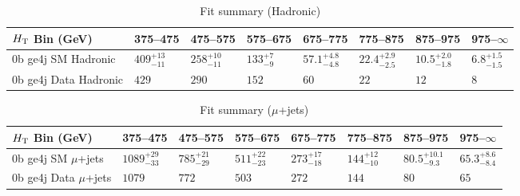 \documentclass[8pt]{article}
\def\scalht{\mbox{$H_{\rm{T}}$}\xspace}
\newcommand\T{\rule{0pt}{2.6ex}}
\begin{document}
\begin{table}[ht!]
\caption{Fit summary (Hadronic)}
\label{tab:ensemble-summary}
\centering
\begin{tabular}{ llllllll }

\hline
\scalht Bin (GeV)       & 375--475                       & 475--575                       & 575--675                       & 675--775                       & 775--875                       & 875--975                       & 975--$\infty$                  \\ [1.000000ex]
\hline
0b ge4j SM Hadronic\T   & $409^{+13}_{-11}$              & $258^{+10}_{-11}$              & $133^{+7}_{-9}$                & $57.1^{+4.8}_{-4.8}$           & $22.4^{+2.9}_{-2.5}$           & $10.5^{+2.0}_{-1.8}$           & $6.8^{+1.5}_{-1.5}$            \\ 
0b ge4j Data Hadronic\T & $429$                          & $290$                          & $152$                          & $60$                           & $22$                           & $12$                           & $8$                            \\ 
\hline

\end{tabular}
\end{table}
\begin{table}[ht!]
\caption{Fit summary ($\mu$+jets)}
\label{tab:ensemble-summary}
\centering
\begin{tabular}{ llllllll }

\hline
\scalht Bin (GeV)       & 375--475                       & 475--575                       & 575--675                       & 675--775                       & 775--875                       & 875--975                       & 975--$\infty$                  \\ [1.000000ex]
\hline
0b ge4j SM $\mu$+jets\T & $1089^{+29}_{-33}$             & $785^{+21}_{-29}$              & $511^{+22}_{-23}$              & $273^{+17}_{-18}$              & $144^{+12}_{-10}$              & $80.5^{+10.1}_{-9.3}$          & $65.3^{+8.6}_{-8.4}$           \\ 
0b ge4j Data $\mu$+jets\T & $1079$                         & $772$                          & $503$                          & $272$                          & $144$                          & $80$                           & $65$                           \\ 
\hline

\end{tabular}
\end{table}
\end{document}
